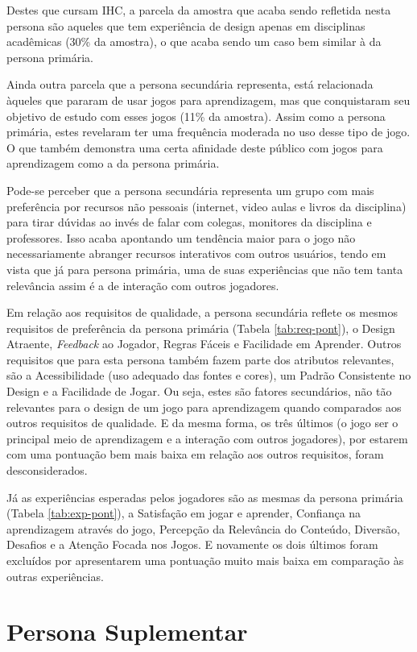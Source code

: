 Destes que cursam IHC, a parcela da amostra que acaba sendo refletida nesta persona são aqueles que tem experiência de design apenas em disciplinas acadêmicas (30\% da amostra), o que acaba sendo um caso bem similar à da persona primária.

Ainda outra parcela que a persona secundária representa, está relacionada àqueles que pararam  de usar jogos para aprendizagem, mas que conquistaram seu objetivo de estudo com esses jogos (11\% da amostra). Assim como a persona primária, estes revelaram ter uma frequência moderada no uso desse tipo de jogo. O que também demonstra uma certa afinidade deste público com jogos para aprendizagem como a da persona primária.

Pode-se perceber que a persona secundária representa um grupo com mais preferência por recursos não pessoais (internet, video aulas e livros da disciplina) para tirar dúvidas ao invés de falar com colegas, monitores da disciplina e professores. Isso acaba apontando um tendência maior para o jogo não necessariamente abranger recursos interativos com outros usuários, tendo em vista que já para persona primária, uma de suas experiências que não tem tanta relevância assim é a de interação com outros jogadores.

Em relação aos requisitos de qualidade, a persona secundária reflete os mesmos requisitos de preferência da persona primária (Tabela \ref{tab:req-pont}), o Design Atraente, \textit{Feedback} ao Jogador, Regras Fáceis e Facilidade em Aprender. Outros requisitos que para esta persona também fazem parte dos atributos relevantes, são a Acessibilidade (uso adequado das fontes e cores), um Padrão Consistente no Design e a Facilidade de Jogar. Ou seja, estes são fatores secundários, não tão relevantes para o design de um jogo para aprendizagem quando comparados aos outros requisitos de qualidade. E da mesma forma, os três últimos (o jogo ser o principal meio de aprendizagem e a interação com outros jogadores), por estarem com uma pontuação bem mais baixa em relação aos outros requisitos, foram desconsiderados.

Já as experiências esperadas pelos jogadores são as mesmas da persona primária (Tabela \ref{tab:exp-pont}), a Satisfação em jogar e aprender, Confiança na aprendizagem através do jogo, Percepção da Relevância do Conteúdo, Diversão, Desafios e a Atenção Focada nos Jogos. E novamente os dois últimos foram excluídos por apresentarem uma pontuação muito mais baixa em comparação às outras experiências. 

\section{Persona Suplementar}
\label{sec:p3}

